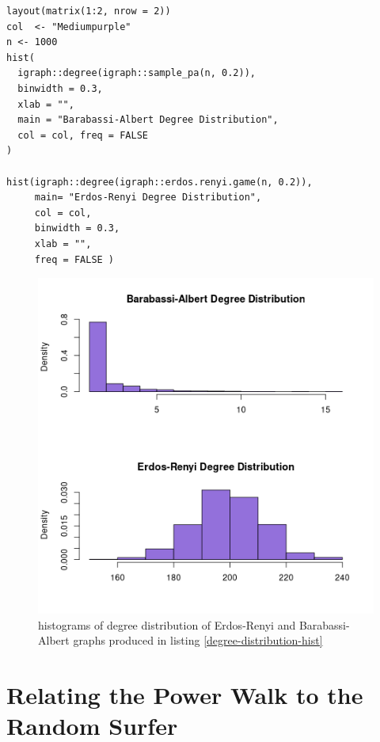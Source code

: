 \documentclass[11pt]{article}
\begin{document}
\begin{listing}[htbp]
\begin{verbatim}
layout(matrix(1:2, nrow = 2))
col  <- "Mediumpurple"
n <- 1000
hist(
  igraph::degree(igraph::sample_pa(n, 0.2)),
  binwidth = 0.3,
  xlab = "",
  main = "Barabassi-Albert Degree Distribution",
  col = col, freq = FALSE
)

hist(igraph::degree(igraph::erdos.renyi.game(n, 0.2)),
     main= "Erdos-Renyi Degree Distribution",
     col = col,
     binwidth = 0.3,
     xlab = "",
     freq = FALSE )
\end{verbatim}
\caption{\label{degree-distribution-hist}Simulate Erdos-Renyi and Barabassi-Albert graphs in order to measure the degree distribution,  shown in \ref{fig:degree-distribution-hist}}
\end{listing}


\begin{figure}[htbp]
\centering
\includegraphics[width=12cm]{media/degree_dist_er_ba.png}
\caption{\label{fig:degree-distribution-hist}histograms of degree distribution of Erdos-Renyi and Barabassi-Albert graphs produced in listing \ref{degree-distribution-hist}}
\end{figure}

\section{Relating the Power Walk to the Random Surfer}
\label{relate-to-random-surfer}
\end{document}
